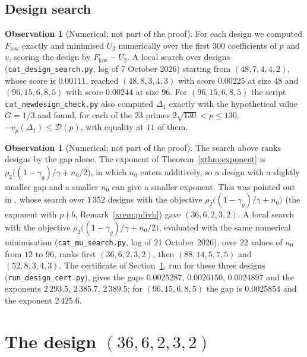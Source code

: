 \documentclass[11pt]{article}
\theoremstyle{definition}
\newtheorem{observation}[theorem]{Observation}
\newcommand{\Dl}{\mathcal{D}}
\begin{document}
\subsection{Design search}

\begin{observation}[Numerical; not part of the proof]
For each design we computed $F_{\mathrm{low}}$ exactly and minimised $U_2$ numerically over the first $300$ coefficients of $p$ and $v$, scoring the design by $F_{\mathrm{low}}-U_2$. A local search over designs (\texttt{cat\_design\_search.py}, log of 7 October 2026) starting from $(48,7,4,4,2)$, whose score is $0.00111$, reached $(48,8,3,4,3)$ with score $0.00225$ at size $48$ and $(96,15,6,8,5)$ with score $0.00244$ at size $96$. For $(96,15,6,8,5)$ the script \texttt{cat\_newdesign\_check.py} also computed $\Delta_1$ exactly with the hypothetical value $G=1/3$ and found, for each of the $23$ primes $2\sqrt{130}<p\le130$, $-v_p(\Delta_1)\le \Dl(p)$, with equality at $11$ of them.
\end{observation}

\begin{observation}[Numerical; not part of the proof]\label{obs:musearch}
The search above ranks designs by the gap alone. The exponent of Theorem~\ref{xthm:exponent} is $\rho_2\big((1-\gamma_g)/\gamma+n_0/2\big)$, in which $n_0$ enters additively, so a design with a slightly smaller gap and a smaller $n_0$ can give a smaller exponent. This was pointed out in \cite{Bojnal}, whose search over $1\,352$ designs with the objective $\rho_2\big((1-\gamma_g)/\gamma+n_0\big)$ (the exponent with $p\nmid b$, Remark~\ref{xrem:pdivb}) gave $(36,6,2,3,2)$. A local search with the objective $\rho_2\big((1-\gamma_g)/\gamma+n_0/2\big)$, evaluated with the same numerical minimisation (\texttt{cat\_mu\_search.py}, log of 21 October 2026), over $22$ values of $n_0$ from $12$ to $96$, ranks first $(36,6,2,3,2)$, then $(88,14,5,7,5)$ and $(52,8,3,4,3)$. The certificate of Section~\ref{sec:design36}, run for these three designs (\texttt{run\_design\_cert.py}), gives the gaps $0.0025287$, $0.0026150$, $0.0024897$ and the exponents $2\,293.5$, $2\,385.7$, $2\,389.5$; for $(96,15,6,8,5)$ the gap is $0.0025854$ and the exponent $2\,425.6$.
\end{observation}

\section{The design \texorpdfstring{$(36,6,2,3,2)$}{(36,6,2,3,2)}}\label{sec:design36}
\end{document}
